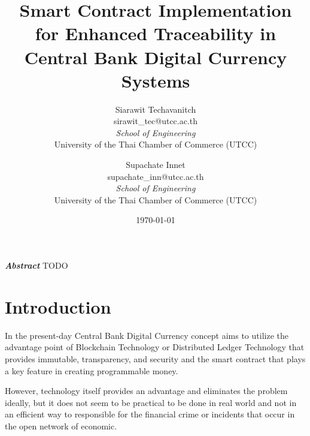 \documentclass[letterpaper,twocolumn,10pt]{article} %
\title{\textbf{Smart Contract Implementation for Enhanced Traceability in Central Bank Digital Currency Systems}} %
\author{
    Siarawit Techavanitch \\ sirawit\_tec@utcc.ac.th \\ \textit{School of Engineering} \\ University of the Thai Chamber of Commerce (UTCC) \and
    Supachate Innet \\ supachate\_inn@utcc.ac.th \\ \textit{School of Engineering} \\ University of the Thai Chamber of Commerce (UTCC) } %
\date{\today} %
\begin{document}
\maketitle %


\textbf{\textit{Abstract}} TODO
\section{Introduction} In the present-day
Central Bank Digital Currency
concept aims to utilize the advantage point of Blockchain Technology
or Distributed Ledger Technology that provides immutable,
transparency, and security and the smart contract that plays a key feature in creating programmable money.

However, technology itself provides an advantage and eliminates the problem ideally,
but it does not seem to be practical to be done in real world and not in an efficient way to responsible for the financial crime or incidents that occur in the open network of economic.
\end{document}
